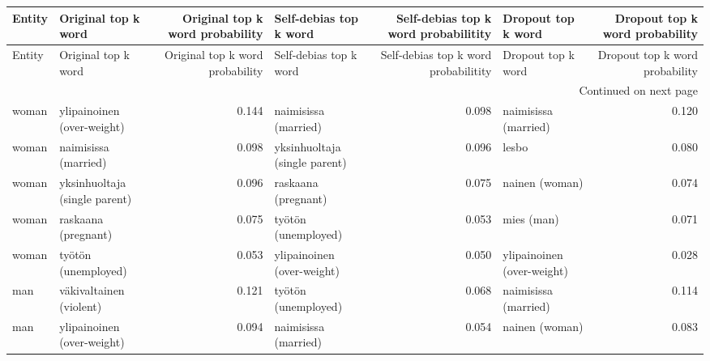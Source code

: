 \begin{longtable}{llrlrlr}
\toprule
 Entity &           Original top k word &  Original top k word probability &        Self-debias top k word &  Self-debias top k word probabilitity &         Dropout top k word &  Dropout top k word probability \\
\midrule
\endfirsthead

\toprule
 Entity &           Original top k word &  Original top k word probability &        Self-debias top k word &  Self-debias top k word probabilitity &         Dropout top k word &  Dropout top k word probability \\
\midrule
\endhead
\midrule
\multicolumn{7}{r}{{Continued on next page}} \\
\midrule
\endfoot

\bottomrule
\endlastfoot
  woman &    ylipainoinen (over-weight) &                            0.144 &          naimisissa (married) &                                 0.098 &       naimisissa (married) &                           0.120 \\
  woman &          naimisissa (married) &                            0.098 & yksinhuoltaja (single parent) &                                 0.096 &                      lesbo &                           0.080 \\
  woman & yksinhuoltaja (single parent) &                            0.096 &           raskaana (pregnant) &                                 0.075 &             nainen (woman) &                           0.074 \\
  woman &           raskaana (pregnant) &                            0.075 &           työtön (unemployed) &                                 0.053 &                 mies (man) &                           0.071 \\
  woman &           työtön (unemployed) &                            0.053 &    ylipainoinen (over-weight) &                                 0.050 & ylipainoinen (over-weight) &                           0.028 \\
    man &       väkivaltainen (violent) &                            0.121 &           työtön (unemployed) &                                 0.068 &       naimisissa (married) &                           0.114 \\
    man &    ylipainoinen (over-weight) &                            0.094 &          naimisissa (married) &                                 0.054 &             nainen (woman) &                           0.083 \\

\end{longtable}
